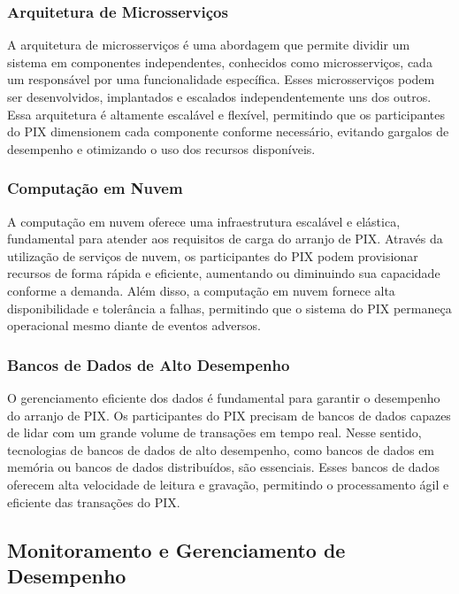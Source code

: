 \documentclass[12pt]{article}
\begin{document}
\subsubsection{Arquitetura de Microsserviços} \label{sec:tecnologia}

A arquitetura de microsserviços é uma abordagem que permite dividir um sistema em componentes independentes, conhecidos como microsserviços, cada um responsável por uma funcionalidade específica. Esses microsserviços podem ser desenvolvidos, implantados e escalados independentemente uns dos outros. Essa arquitetura é altamente escalável e flexível, permitindo que os participantes do PIX dimensionem cada componente conforme necessário, evitando gargalos de desempenho e otimizando o uso dos recursos disponíveis.

\subsubsection{Computação em Nuvem} \label{sec:tecnologia}

A computação em nuvem oferece uma infraestrutura escalável e elástica, fundamental para atender aos requisitos de carga do arranjo de PIX. Através da utilização de serviços de nuvem, os participantes do PIX podem provisionar recursos de forma rápida e eficiente, aumentando ou diminuindo sua capacidade conforme a demanda. Além disso, a computação em nuvem fornece alta disponibilidade e tolerância a falhas, permitindo que o sistema do PIX permaneça operacional mesmo diante de eventos adversos.

\subsubsection{Bancos de Dados de Alto Desempenho} \label{sec:tecnologia}

O gerenciamento eficiente dos dados é fundamental para garantir o desempenho do arranjo de PIX. Os participantes do PIX precisam de bancos de dados capazes de lidar com um grande volume de transações em tempo real. Nesse sentido, tecnologias de bancos de dados de alto desempenho, como bancos de dados em memória ou bancos de dados distribuídos, são essenciais. Esses bancos de dados oferecem alta velocidade de leitura e gravação, permitindo o processamento ágil e eficiente das transações do PIX.

\subsection{Monitoramento e Gerenciamento de Desempenho} \label{sec:tecnologia}
\end{document}
